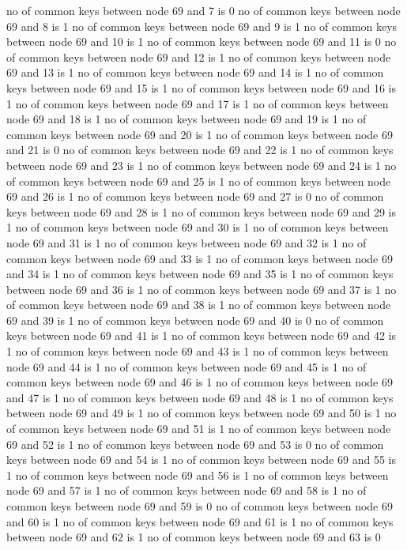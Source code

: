 no of common keys between node 69 and 7 is 0
no of common keys between node 69 and 8 is 1
no of common keys between node 69 and 9 is 1
no of common keys between node 69 and 10 is 1
no of common keys between node 69 and 11 is 0
no of common keys between node 69 and 12 is 1
no of common keys between node 69 and 13 is 1
no of common keys between node 69 and 14 is 1
no of common keys between node 69 and 15 is 1
no of common keys between node 69 and 16 is 1
no of common keys between node 69 and 17 is 1
no of common keys between node 69 and 18 is 1
no of common keys between node 69 and 19 is 1
no of common keys between node 69 and 20 is 1
no of common keys between node 69 and 21 is 0
no of common keys between node 69 and 22 is 1
no of common keys between node 69 and 23 is 1
no of common keys between node 69 and 24 is 1
no of common keys between node 69 and 25 is 1
no of common keys between node 69 and 26 is 1
no of common keys between node 69 and 27 is 0
no of common keys between node 69 and 28 is 1
no of common keys between node 69 and 29 is 1
no of common keys between node 69 and 30 is 1
no of common keys between node 69 and 31 is 1
no of common keys between node 69 and 32 is 1
no of common keys between node 69 and 33 is 1
no of common keys between node 69 and 34 is 1
no of common keys between node 69 and 35 is 1
no of common keys between node 69 and 36 is 1
no of common keys between node 69 and 37 is 1
no of common keys between node 69 and 38 is 1
no of common keys between node 69 and 39 is 1
no of common keys between node 69 and 40 is 0
no of common keys between node 69 and 41 is 1
no of common keys between node 69 and 42 is 1
no of common keys between node 69 and 43 is 1
no of common keys between node 69 and 44 is 1
no of common keys between node 69 and 45 is 1
no of common keys between node 69 and 46 is 1
no of common keys between node 69 and 47 is 1
no of common keys between node 69 and 48 is 1
no of common keys between node 69 and 49 is 1
no of common keys between node 69 and 50 is 1
no of common keys between node 69 and 51 is 1
no of common keys between node 69 and 52 is 1
no of common keys between node 69 and 53 is 0
no of common keys between node 69 and 54 is 1
no of common keys between node 69 and 55 is 1
no of common keys between node 69 and 56 is 1
no of common keys between node 69 and 57 is 1
no of common keys between node 69 and 58 is 1
no of common keys between node 69 and 59 is 0
no of common keys between node 69 and 60 is 1
no of common keys between node 69 and 61 is 1
no of common keys between node 69 and 62 is 1
no of common keys between node 69 and 63 is 0
